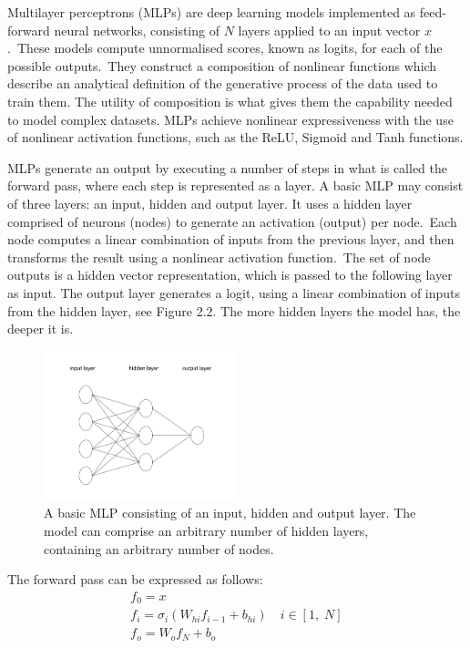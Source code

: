 \noindent Multilayer perceptrons (MLPs) are deep learning models implemented as feed-forward neural networks, consisting of $N$ layers applied to an input vector $ x $.\ These models compute unnormalised scores, known as logits, for each of the possible outputs.\ They construct a composition of nonlinear functions which describe an analytical definition of the generative process of the data used to train them. The utility of composition is what gives them the capability needed to model complex datasets. MLPs achieve nonlinear expressiveness with the use of nonlinear activation functions, such as the ReLU, Sigmoid and Tanh functions.  \par

\noindent MLPs generate an output by executing a number of steps in what is called the forward pass, where each step is represented as a layer. A basic MLP may consist of three layers: an input, hidden and output layer. It uses a hidden layer comprised of neurons (nodes) to generate an activation (output) per node.\ Each node computes a linear combination of inputs from the previous layer, and then transforms the result using a nonlinear activation function.\ The set of node outputs is a hidden vector representation, which is passed to the following layer as input. The output layer generates a logit, using a linear combination of inputs from the hidden layer, see Figure 2.2. The more hidden layers the model has, the deeper it is.

\begin{figure}[H]
   	\centering
    	\includegraphics[width=0.5\textwidth, height=0.3\textwidth]{multilayer_perceptron}
	\captionsetup{justification=centering}
	\caption{A basic MLP consisting of an input, hidden and output layer. The model can comprise an arbitrary number of hidden layers, containing an arbitrary number of nodes.}
\end{figure}

\noindent The forward pass can be expressed as follows:
\begin{subequations}
	\begin{gather}
		f_0 = x \\
		f_i=\sigma_i(W_{hi}f_{i - 1} + b_{hi}) \quad i \in [1, \; N] \\
		f_o = W_{o}f_N + b_o
	\end{gather}
\end{subequations}


